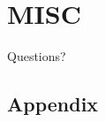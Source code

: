 \documentclass{beamer}
\newcommand{\weib}{\CJKfamily{weib}}
\begin{document}
\section{MISC}
\begin{frame}
	\begin{center}
    \LARGE{Questions?}
	\end{center}
\end{frame}


\subsection{Appendix}
\end{document}
